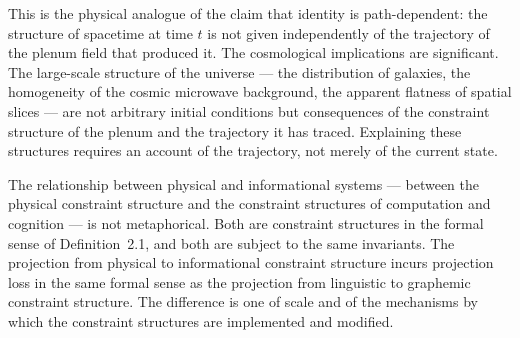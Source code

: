 \documentclass[12pt, twoside]{article}
\theoremstyle{plain}
\theoremstyle{definition}
\theoremstyle{remark}
\begin{document}
This is the physical analogue of the claim that identity is path-dependent:
the structure of spacetime at time $t$ is not given independently
of the trajectory of the plenum field that produced it.
The cosmological implications are significant.
The large-scale structure of the universe — the distribution of
galaxies, the homogeneity of the cosmic microwave background,
the apparent flatness of spatial slices — are not arbitrary
initial conditions but consequences of the constraint structure
of the plenum and the trajectory it has traced.
Explaining these structures requires an account of the trajectory,
not merely of the current state.

The relationship between physical and informational systems —
between the physical constraint structure and the constraint structures
of computation and cognition — is not metaphorical.
Both are constraint structures in the formal sense of Definition~2.1,
and both are subject to the same invariants.
The projection from physical to informational constraint structure
incurs projection loss in the same formal sense as the projection
from linguistic to graphemic constraint structure.
The difference is one of scale and of the mechanisms by which
the constraint structures are implemented and modified.
\end{document}
